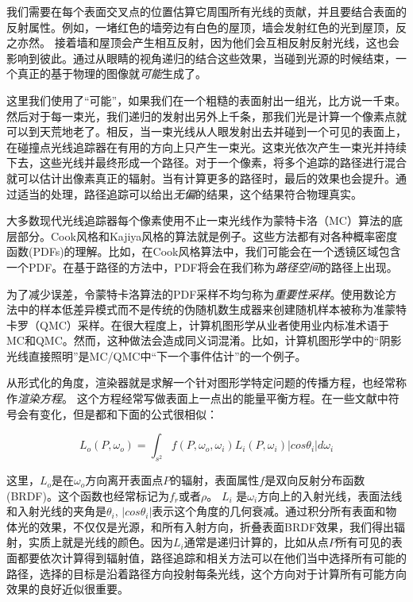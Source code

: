 \documentclass[12pt]{article}
\begin{document}
我们需要在每个表面交叉点的位置估算它周围所有光线的贡献，并且要结合表面的反射属性。例如，一堵红色的墙旁边有白色的屋顶，墙会发射红色的光到屋顶，反之亦然。 接着墙和屋顶会产生相互反射，因为他们会互相反射反射光线，这也会影响到彼此。通过从眼睛的视角递归的结合这些效果，当碰到光源的时候结束，一个真正的基于物理的图像就\textit{可能}生成了。

这里我们使用了“可能”，如果我们在一个粗糙的表面射出一组光，比方说一千束。然后对于每一束光，我们递归的发射出另外上千条，那我们光是计算一个像素点就可以到天荒地老了。相反，当一束光线从人眼发射出去并碰到一个可见的表面上，在碰撞点光线追踪器在有用的方向上只产生一束光。这束光依次产生一束光并持续下去，这些光线并最终形成一个路径。对于一个像素，将多个追踪的路径进行混合就可以估计出像素真正的辐射。当有计算更多的路径时，最后的效果也会提升。通过适当的处理，路径追踪可以给出\textit{无偏}的结果，这个结果符合物理真实。

大多数现代光线追踪器每个像素使用不止一束光线作为蒙特卡洛（MC）算法的底层部分。Cook风格和Kajiya风格的算法就是例子。这些方法都有对各种概率密度函数(PDFs)的理解。比如，在Cook风格算法中，我们可能会在一个透镜区域包含一个PDF。在基于路径的方法中，PDF将会在我们称为\textit{路径空间}的路径上出现。

为了减少误差，令蒙特卡洛算法的PDF采样不均匀称为\textit{重要性采样}。使用数论方法中的样本低差异模式而不是传统的伪随机数生成器来创建随机样本被称为准蒙特卡罗（QMC）采样。在很大程度上，计算机图形学从业者使用业内标准术语于MC和QMC。然而，这种做法会造成同义词混淆。比如，计算机图形学中的“阴影光线直接照明”是MC/QMC中“下一个事件估计”的一个例子。

从形式化的角度，渲染器就是求解一个针对图形学特定问题的传播方程，也经常称作\textit{渲染方程}。 这个方程经常写做表面上一点出的能量平衡方程。在一些文献中符号会有变化，但是都和下面的公式很相似：

\begin{equation}
L_o(P, \omega_o) = \int_{s^2} f(P, \omega_o,\omega_i)L_i(P,\omega_i) |cos\theta_i|d\omega_i
\end{equation}

这里，$L_o$是在$\omega_o$方向离开表面点$P$的辐射，表面属性$f$是双向反射分布函数(BRDF)。这个函数也经常标记为$f_r$或者$\rho$。 $L_i$ 是$\omega_i$方向上的入射光线，表面法线和入射光线的夹角是$\theta_i$, $|cos \theta_i|$表示这个角度的几何衰减。通过积分所有表面和物体光的效果，不仅仅是光源，和所有入射方向，折叠表面BRDF效果，我们得出辐射，实质上就是光线的颜色。因为$L_i$通常是递归计算的，比如从点$P$所有可见的表面都要依次计算得到辐射值，路径追踪和相关方法可以在他们当中选择所有可能的路径，选择的目标是沿着路径方向投射每条光线，这个方向对于计算所有可能方向效果的良好近似很重要。
\end{document}
